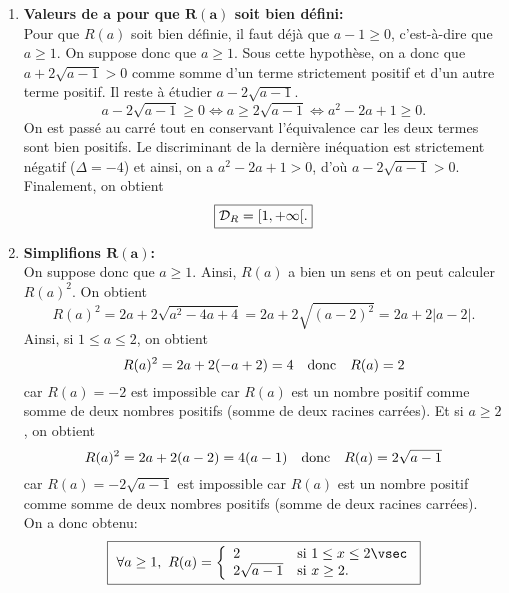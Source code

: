 \begin{correction}   \;
\begin{enumerate}
\item \textbf{Valeurs de $\mathbf{a}$ pour que $\mathbf{R(a)}$ soit bien d\'efini:}\\
\noindent Pour que $R(a)$ soit bien d\'efinie, il faut d\'ej\`a que $a-1\geq 0$, c'est-\`a-dire que $a\geq 1$. On suppose donc que $a\geq 1$.
Sous cette hypoth\`ese, on a donc que $a+2\sqrt{a-1}>0$ comme somme d'un terme strictement positif et d'un autre terme positif. Il reste \`a \'etudier $a-2\sqrt{a-1}$.
$$a-2\sqrt{a-1}\geq 0\Leftrightarrow a\geq 2\sqrt{a-1}\Leftrightarrow a^2-2a+1\geq 0.$$
On est pass\'e au carr\'e tout en conservant l'\'equivalence car les deux termes sont bien positifs. Le discriminant de la derni\`ere in\'equation est strictement n\'egatif ($\Delta=-4$) et ainsi, on a $a^2-2a+1>0$, d'o\`u $a-2\sqrt{a-1}>0$. Finalement, on obtient
$$\fbox{$ \mathcal{D}_R=\lbrack 1,+\infty\lbrack. $}$$
\item \textbf{Simplifions $\mathbf{R(a)}$:} \\
\noindent On suppose donc que $a\geq 1$. Ainsi, $R(a)$ a bien un sens et on peut calculer $R(a)^2$. On obtient
$$R(a)^2=2a+2\sqrt{a^2-4a+4}=2a+2\sqrt{(a-2)^2}=2a+2|a-2|.$$
Ainsi, si $1\leq a\leq 2$, on obtient
$$R(a)^2=2a+2(-a+2)=4\quad \hbox{donc}\quad R(a)=2$$
car $R(a)=-2$ est impossible car $R(a)$ est un nombre positif comme somme de deux nombres positifs (somme de deux racines carr\'ees).
Et si $a\geq 2$, on obtient
$$R(a)^2=2a+2(a-2)=4(a-1)\quad \hbox{donc}\quad R(a)=2\sqrt{a-1}$$
car $R(a)=-2\sqrt{a-1}$ est impossible car $R(a)$ est un nombre positif comme somme de deux nombres positifs (somme de deux racines carr\'ees). \\
\noindent On a donc obtenu:
$$\fbox{ $
\forall a\geq 1,\ R(a)=\left\lbrace
\begin{array}{ll}
2 & \hbox{si}\ 1\leq x\leq 2\vsec\\
2\sqrt{a-1} & \hbox{si}\ x\geq 2.
\end{array}
\right.
$}$$


\end{enumerate}
\end{correction}





